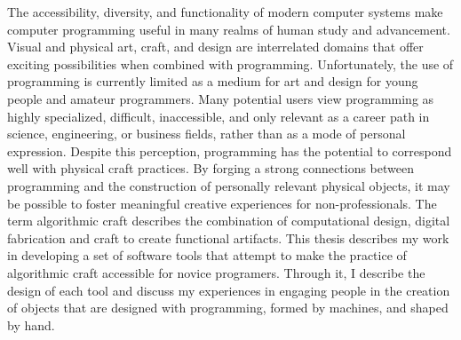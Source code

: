 % 
% 
%
The accessibility, diversity, and functionality of modern computer systems make computer programming useful in many realms of human study and advancement. Visual and physical art, craft, and design are interrelated domains that offer exciting possibilities when combined with programming. Unfortunately, the use of programming is currently limited as a medium for art and design for young people and amateur programmers. Many potential users view programming as highly specialized, difficult, inaccessible, and only relevant as a career path in science, engineering, or business fields, rather than as a mode of personal expression. Despite this perception, programming has the potential to correspond well with physical craft practices. By forging a strong connections between programming and the construction of personally relevant physical objects, it may be possible to foster meaningful creative experiences for non-professionals. The term algorithmic craft describes the combination of computational design, digital fabrication and craft to create functional artifacts. This thesis describes my work in developing a set of software tools that attempt to make the practice of algorithmic craft accessible for novice programers. Through it, I describe the design of each tool and discuss my experiences in engaging people in the creation of objects that are designed with programming, formed by machines, and shaped by hand. 